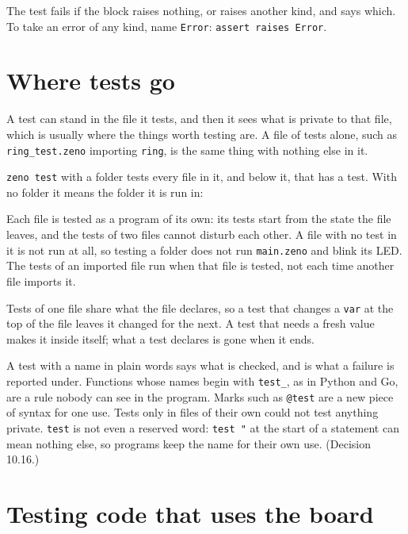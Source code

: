 The test fails if the block raises nothing, or raises another kind,
and says which. To take an error of any kind, name \verb|Error|:
\verb|assert raises Error|.

\section{Where tests go}

A test can stand in the file it tests, and then it sees what is
private to that file, which is usually where the things worth testing
are. A file of tests alone, such as \verb|ring_test.zeno| importing
\verb|ring|, is the same thing with nothing else in it.

\verb|zeno test| with a folder tests every file in it, and below it,
that has a test. With no folder it means the folder it is run in:


Each file is tested as a program of its own: its tests start from the
state the file leaves, and the tests of two files cannot disturb each
other. A file with no test in it is not run at all, so testing a
folder does not run \verb|main.zeno| and blink its LED. The tests of
an imported file run when that file is tested, not each time another
file imports it.

Tests of one file share what the file declares, so a test that changes
a \verb|var| at the top of the file leaves it changed for the next. A
test that needs a fresh value makes it inside itself; what a test
declares is gone when it ends.

\begin{why}
A test with a name in plain words says what is checked, and is what a
failure is reported under. Functions whose names begin with
\verb|test_|, as in Python and Go, are a rule nobody can see in the
program. Marks such as \verb|@test| are a new piece of syntax for one
use. Tests only in files of their own could not test anything
private. \verb|test| is not even a reserved word: \verb|test "| at the
start of a statement can mean nothing else, so programs keep the name
for their own use. (Decision 10.16.)
\end{why}

\section{Testing code that uses the board}

